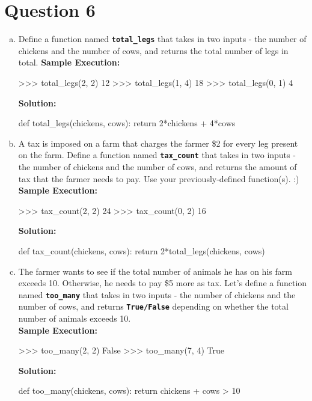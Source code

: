 \section{Question 6}
\begin{enumerate}[(a)]
\item Define a function named \texttt{\bfseries total\_legs} that takes in two inputs - the number of chickens and the number of cows,
and returns the total number of legs in total.
\textbf{Sample Execution:}
\begin{python}
>>> total_legs(2, 2)
12
>>> total_legs(1, 4)
18
>>> total_legs(0, 1)
4
\end{python}
\textbf{Solution:}
\begin{python}
def total_legs(chickens, cows):
    return 2*chickens + 4*cows
\end{python}

\item A tax is imposed on a farm that charges the farmer \$2 for every leg present on the farm. Define a function named
\texttt{\bfseries tax\_count} that takes in two inputs - the number of chickens and the number of cows, and returns the amount of tax that
the farmer needs to pay. Use your previously-defined function(s). :) \\
\textbf{Sample Execution:}
\begin{python}
>>> tax_count(2, 2)
24
>>> tax_count(0, 2)
16
\end{python}
\textbf{Solution:}
\begin{python}
def tax_count(chickens, cows):
    return 2*total_legs(chickens, cows)
\end{python}
  
\item The farmer wants to see if the total number of animals he has on his farm exceeds 10. Otherwise, he needs to pay \$5
more as tax. Let’s define a function named \texttt{\bfseries too\_many} that takes in two inputs - the number of chickens and the number of cows,
and returns \texttt{\bfseries True/False} depending on whether the total number of animals exceeds 10. \\
\textbf{Sample Execution:}
\begin{python}
>>> too_many(2, 2)
False
>>> too_many(7, 4)
True
\end{python}
\textbf{Solution:}
\begin{python}
def too_many(chickens, cows):
    return chickens + cows > 10
\end{python}


\end{enumerate}
